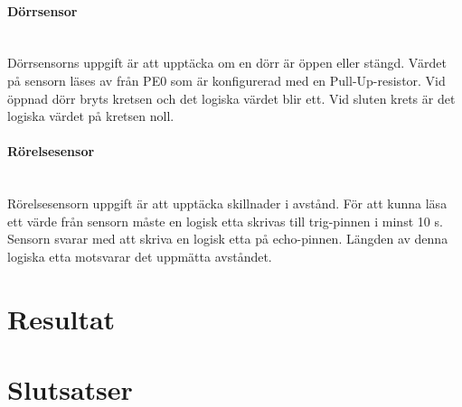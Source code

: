 \documentclass[a4paper]{article}
\newcommand{\subsubsubsection}[1]{\paragraph{#1}\mbox{}\\}
\begin{document}
\subsubsubsection{Dörrsensor}
Dörrsensorns uppgift är att upptäcka om en dörr är öppen eller stängd.
Värdet på sensorn läses av från PE0 som är konfigurerad med en Pull-Up-resistor.
Vid öppnad dörr bryts kretsen och det logiska värdet blir ett.
Vid sluten krets är det logiska värdet på kretsen noll.

\subsubsubsection{Rörelsesensor}
Rörelsesensorn uppgift är att upptäcka skillnader i avstånd.
För att kunna läsa ett värde från sensorn måste en logisk etta skrivas till trig-pinnen i minst 10 \textmu s.
Sensorn svarar med att skriva en logisk etta på echo-pinnen.
Längden av denna logiska etta motsvarar det uppmätta avståndet.

\section{Resultat}

\section{Slutsatser}




\end{document}
